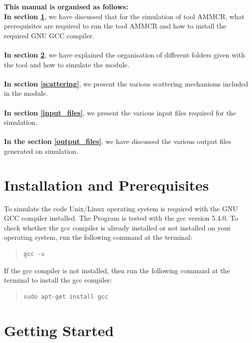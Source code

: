 \documentclass[12pt]{article}
\begin{document}
\textbf{This manual is organised as follows:} \\
\textbf{In section \ref{installation}}, we have discussed that for the simulation of tool AMMCR, what prerequisites are required to run the tool AMMCR and how to install the required GNU GCC compiler.  \\  \\
\textbf{In section \ref{getting_started}}, we have explained the organisation of different folders given with the tool and how to simulate the module. \\ \\
\textbf{In section \ref{scattering}}, we present the various scattering mechanisms included in the module. \\ \\
\textbf{In section \ref{input_files}}, we present the various input files required for the simulation. \\ \\
\textbf{In the section \ref{output_files}}, we have discussed the various output files generated on simulation. \\

\section{Installation and Prerequisites} \label{installation}
To simulate the code Unix/Linux operating system is required with the GNU GCC compiler installed. The Program is tested with the gcc version 5.4.0.
\newline To check whether the gcc compiler is already installed or not installed on your operating system, run the following command at the terminal:

\begin{quote}
\begin{verbatim}
gcc -v
\end{verbatim}
\end{quote}

If the gcc compiler is not installed, then run the following command at the terminal to install the gcc compiler: 

\begin{quote}
\begin{verbatim}
sudo apt-get install gcc
\end{verbatim}
\end{quote}


\section{Getting Started} \label{getting_started}
\end{document}

